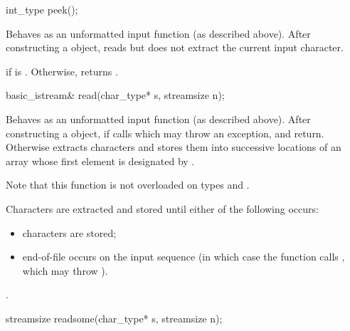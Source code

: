 %
\begin{itemdecl}
int_type peek();
\end{itemdecl}

\begin{itemdescr}
\pnum
\effects
Behaves as an unformatted input function
(as described above).
After constructing a  object, reads but does not extract
the current input character.

\pnum
\returns
{}
if
is
.
Otherwise, returns
.
\end{itemdescr}

%
\begin{itemdecl}
basic_istream& read(char_type* s, streamsize n);
\end{itemdecl}

\begin{itemdescr}
\pnum
\effects
Behaves as an unformatted input function (as described above).
After constructing
a  object, if
calls
which may throw an exception,
and return.
Otherwise extracts characters and stores them
into successive locations of an array whose first element is designated by
.
\begin{footnote}
Note that this function is not overloaded on types
and
.
\end{footnote}
Characters are extracted and stored until either of the following occurs:
\begin{itemize}
\item
{} characters are stored;
\item
end-of-file occurs on the input sequence
(in which case the function calls
,
which may throw
).
\end{itemize}

\pnum
\returns
{}.
\end{itemdescr}

%
\begin{itemdecl}
streamsize readsome(char_type* s, streamsize n);
\end{itemdecl}

